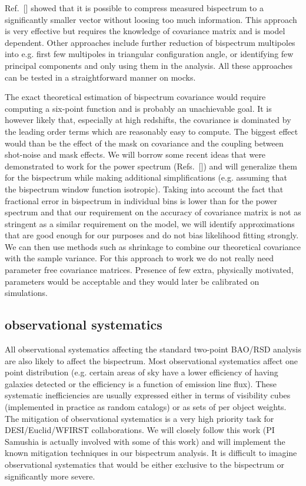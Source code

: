 Ref.~[] showed that it is possible to compress measured bispectrum to a
significantly smaller vector without loosing too much information. This
approach is very effective but requires the knowledge of covariance matrix and
is model dependent. Other approaches include further reduction of bispectrum
multipoles into e.g. first few multipoles in triangular configuration angle, or
identifying few principal components and only using them in the analysis. All
these approaches can be tested in a straightforward manner on mocks.

The exact theoretical estimation of bispectrum covariance would require
computing a six-point function and is probably an unachievable goal. It is
however likely that, especially at high redshifts, the covariance is dominated
by the leading order terms which are reasonably easy to compute. The biggest
effect would than be the effect of the mask on covariance and the coupling
between shot-noise and mask effects. We will borrow some recent ideas that were
demonstrated to work for the power spectrum (Refs.~[]) and will generalize them
for the bispectrum while making additional simplifications (e.g. assuming that
the bispectrum window function isotropic). Taking into account the fact that
fractional error in bispectrum in individual bins is lower than for the power
spectrum and that our requirement on the accuracy of covariance matrix is not
as stringent as a similar requirement on the model, we will identify
approximations that are good enough for our purposes and do not bias likelihood
fitting strongly. We can then use methods such as shrinkage to combine our
theoretical covariance with the sample variance. For this approach to work we
do not really need parameter free covariance matrices. Presence of few extra,
physically motivated, parameters would be acceptable and they would later be
calibrated on simulations.

\subsection*{observational systematics}

All observational systematics affecting the standard two-point BAO/RSD analysis
are also likely to affect the bispectrum. Most observational systematics affect
one point distribution (e.g. certain areas of sky have a lower efficiency of
having galaxies detected or the efficiency is a function of emission line
flux). These systematic inefficiencies are usually expressed either in terms of
visibility cubes (implemented in practice as random catalogs) or as sets of
per object weights. The mitigation of observational systematics is a very high
priority task for DESI/Euclid/WFIRST collaborations. We will closely follow
this work (PI Samushia is actually involved with some of this work) and will
implement the known mitigation techniques in our bispectrum analysis. It is
difficult to imagine observational systematics that would be either exclusive
to the bispectrum or significantly more severe.

